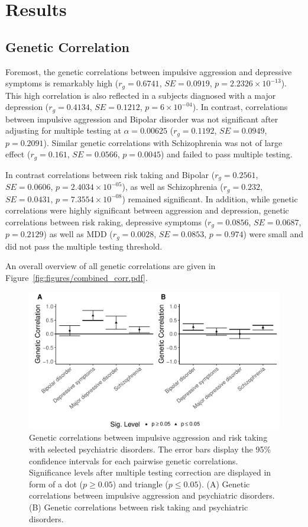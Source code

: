 \section{Results}
\label{sec:results}

\subsection{Genetic Correlation}
\label{sub:psych_genetic_correlation}

Foremost, the genetic correlations between impulsive aggression and depressive symptoms is remarkably high ($r_g=0.6741$, $SE=0.0919$, $p=2.2326\times 10^{-13}$).
This high correlation is also reflected in a subjects diagnosed with a major depression ($r_g=0.4134$, $SE=0.1212$, $p=6\times 10^{-04}$).
In contrast, correlations between impulsive aggression and Bipolar disorder was not significant after adjusting for multiple testing at $\alpha=0.00625$ ($r_g=0.1192$, $SE=0.0949$, $p=0.2091$).
Similar genetic correlations with Schizophrenia was not of large effect ($r_g=0.161$, $SE=0.0566$, $p=0.0045$) and failed to pass multiple testing.

In contrast correlations between risk taking and Bipolar ($r_g=0.2561$, $SE=0.0606$, $p=2.4034\times 10^{-05}$), as well as Schizophrenia ($r_g=0.232$, $SE=0.0431$, $p=7.3554\times 10^{-08}$) remained significant.
In addition, while genetic correlations were highly significant between aggression and depression, genetic correlations between risk raking, depressive symptoms ($r_g=0.0856$, $SE=0.0687$, $p=0.2129$) as well as MDD ($r_g=0.0028$, $SE=0.0853$, $p=0.974$) were small and did not pass the multiple testing threshold.

An overall overview of all genetic correlations are given in Figure~\ref{fig:figures/combined_corr.pdf}.

\begin{figure}[htpb]
  \centering
  \includegraphics[width=0.8\linewidth]{figures/combined_corr.pdf}
  \caption{Genetic correlations between impulsive aggression and risk taking with selected psychiatric disorders.
    The error bars display the 95\% confidence intervals for each pairwise genetic correlations.
    Significance levels after multiple testing correction are displayed in form of a dot ($p\ge 0.05$) and triangle ($p\leq0.05$).
    (A) Genetic correlations between impulsive aggression and psychiatric disorders. 
    (B) Genetic correlations between risk taking and psychiatric disorders.
  }\label{fig:figures/combined_corr}
\end{figure}


